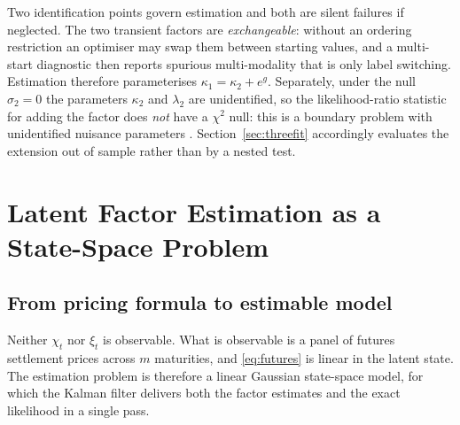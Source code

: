 \documentclass[journal]{IEEEtran}
\begin{document}
Two identification points govern estimation and both are silent failures if neglected. The two transient factors are \emph{exchangeable}: without an ordering restriction an optimiser may swap them between starting values, and a multi-start diagnostic then reports spurious multi-modality that is only label switching. Estimation therefore parameterises $\kappa_1 = \kappa_2 + e^{g}$. Separately, under the null $\sigma_2 = 0$ the parameters $\kappa_2$ and $\lambda_2$ are unidentified, so the likelihood-ratio statistic for adding the factor does \emph{not} have a $\chi^2$ null: this is a boundary problem with unidentified nuisance parameters \cite{Davies1987}. Section~\ref{sec:threefit} accordingly evaluates the extension out of sample rather than by a nested test.

\section{Latent Factor Estimation as a State-Space Problem}
\label{sec:statespace}

\subsection{From pricing formula to estimable model}

Neither $\chi_t$ nor $\xi_t$ is observable. What is observable is a panel of futures settlement prices across $m$ maturities, and \eqref{eq:futures} is linear in the latent state. The estimation problem is therefore a linear Gaussian state-space model, for which the Kalman filter delivers both the factor estimates and the exact likelihood in a single pass.
\end{document}
